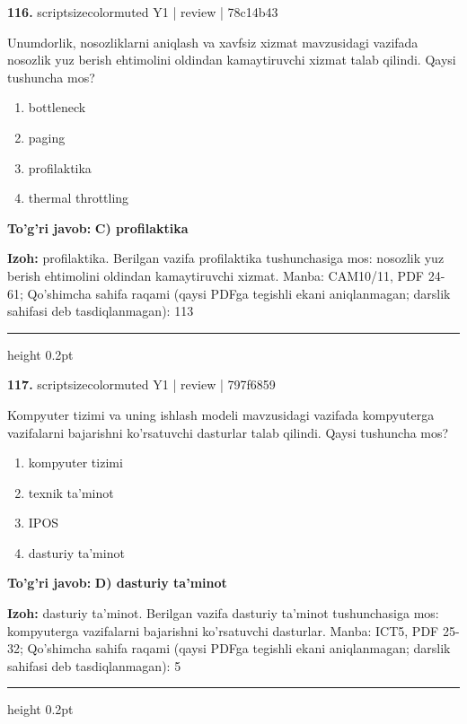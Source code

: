 \documentclass[10pt,a4paper]{article}
\begin{document}
{\bfseries\sffamily\color{ink} 116.} {scriptsizecolor{muted} Y1 | review | 78c14b43}
\par
Unumdorlik, nosozliklarni aniqlash va xavfsiz xizmat mavzusidagi vazifada nosozlik yuz berish ehtimolini oldindan kamaytiruvchi xizmat talab qilindi. Qaysi tushuncha mos?
\begin{enumerate}[label=\Alph*),leftmargin=9mm]
\item bottleneck
\item paging
\item profilaktika
\item thermal throttling
\end{enumerate}
\begin{tcolorbox}[enhanced,breakable,colback=teal!4,colframe=teal!60!black,boxrule=0.45pt,arc=1.2mm,left=2.7mm,right=2.7mm,top=1.8mm,bottom=1.8mm,before skip=2mm,after skip=2mm]
{\bfseries\sffamily\color{teal}To'g'ri javob:} \textbf{C) profilaktika}
\par\smallskip
{\bfseries Izoh:} profilaktika. Berilgan vazifa profilaktika tushunchasiga mos: nosozlik yuz berish ehtimolini oldindan kamaytiruvchi xizmat. Manba: CAM10/11, PDF 24-61; Qo'shimcha sahifa raqami (qaysi PDFga tegishli ekani aniqlanmagan; darslik sahifasi deb tasdiqlanmagan): 113
\end{tcolorbox}
\vspace{2mm}\hrule height 0.2pt\vspace{3mm}

{\bfseries\sffamily\color{ink} 117.} {scriptsizecolor{muted} Y1 | review | 797f6859}
\par
Kompyuter tizimi va uning ishlash modeli mavzusidagi vazifada kompyuterga vazifalarni bajarishni ko'rsatuvchi dasturlar talab qilindi. Qaysi tushuncha mos?
\begin{enumerate}[label=\Alph*),leftmargin=9mm]
\item kompyuter tizimi
\item texnik ta'minot
\item IPOS
\item dasturiy ta'minot
\end{enumerate}
\begin{tcolorbox}[enhanced,breakable,colback=teal!4,colframe=teal!60!black,boxrule=0.45pt,arc=1.2mm,left=2.7mm,right=2.7mm,top=1.8mm,bottom=1.8mm,before skip=2mm,after skip=2mm]
{\bfseries\sffamily\color{teal}To'g'ri javob:} \textbf{D) dasturiy ta'minot}
\par\smallskip
{\bfseries Izoh:} dasturiy ta'minot. Berilgan vazifa dasturiy ta'minot tushunchasiga mos: kompyuterga vazifalarni bajarishni ko'rsatuvchi dasturlar. Manba: ICT5, PDF 25-32; Qo'shimcha sahifa raqami (qaysi PDFga tegishli ekani aniqlanmagan; darslik sahifasi deb tasdiqlanmagan): 5
\end{tcolorbox}
\vspace{2mm}\hrule height 0.2pt\vspace{3mm}
\end{document}
